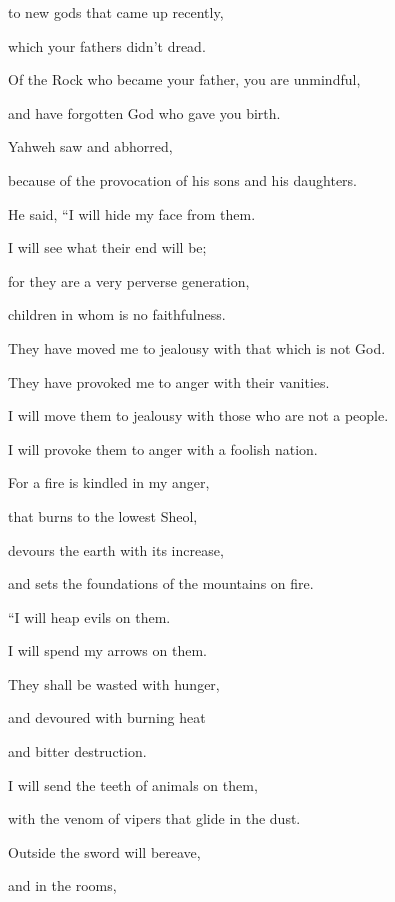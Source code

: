 {\par }{\QB to new gods that came up recently,
\par }{\QB which your fathers didn’t dread.
\par }{\Q {}Of the Rock who became your father, you are unmindful,
\par }{\QB and have forgotten God who gave you birth.
\par }{\Q {}Yahweh saw and abhorred,
\par }{\QB because of the provocation of his sons and his daughters.
\par }{\Q {}He said, “I will hide my face from them.
\par }{\QB I will see what their end will be;
\par }{\Q for they are a very perverse generation,
\par }{\QB children in whom is no faithfulness.
\par }{\Q {}They have moved me to jealousy with that which is not God.
\par }{\QB They have provoked me to anger with their vanities.
\par }{\Q I will move them to jealousy with those who are not a people.
\par }{\QB I will provoke them to anger with a foolish nation.
\par }{\Q {}For a fire is kindled in my anger,
\par }{\QB that burns to the lowest Sheol,
\par }{\QB devours the earth with its increase,
\par }{\QB and sets the foundations of the mountains on fire.
\par }{\BB \par }{\Q {}“I will heap evils on them.
\par }{\QB I will spend my arrows on them.
\par }{\Q {}They shall be wasted with hunger,
\par }{\QB and devoured with burning heat
\par }{\QB and bitter destruction.
\par }{\Q I will send the teeth of animals on them,
\par }{\QB with the venom of vipers that glide in the dust.
\par }{\Q {}Outside the sword will bereave,
\par }{\QB and in the rooms,
}
